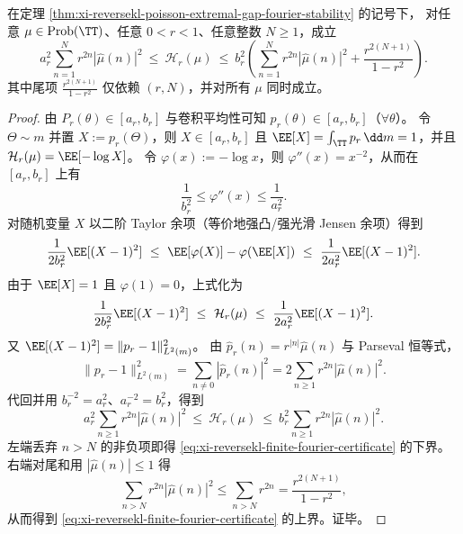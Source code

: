 \begin{theorem}\label{thm:xi-reversekl-finite-fourier-certificate}
在定理 \ref{thm:xi-reversekl-poisson-extremal-gap-fourier-stability} 的记号下，
对任意 \(\mu\in\mathrm{Prob}(\TT)\)、任意 \(0<r<1\)、任意整数 \(N\ge 1\)，成立
\begin{equation}\label{eq:xi-reversekl-finite-fourier-certificate}
\boxed{\;
a_r^{2}\sum_{n=1}^{N} r^{2n}|\widehat\mu(n)|^2
\ \le\
\mathcal H_r(\mu)
\ \le\
b_r^{2}\left(\sum_{n=1}^{N} r^{2n}|\widehat\mu(n)|^2+\frac{r^{2(N+1)}}{1-r^2}\right).\;}
\end{equation}
其中尾项 \(\frac{r^{2(N+1)}}{1-r^2}\) 仅依赖 \((r,N)\)，并对所有 \(\mu\) 同时成立。
\end{theorem}
\begin{proof}
由 \(P_r(\theta)\in[a_r,b_r]\) 与卷积平均性可知 \(p_r(\theta)\in[a_r,b_r]\)（\(\forall\theta\)）。
令 \(\Theta\sim m\) 并置 \(X:=p_r(\Theta)\)，则 \(X\in[a_r,b_r]\) 且 \(\EE[X]=\int_{\TT}p_r\,\dd m=1\)，并且
\(\mathcal H_r(\mu)=\EE[-\log X]\)。
令 \(\varphi(x):=-\log x\)，则 \(\varphi''(x)=x^{-2}\)，从而在 \([a_r,b_r]\) 上有
\[
\frac{1}{b_r^2}\le \varphi''(x)\le \frac{1}{a_r^2}.
\]
对随机变量 \(X\) 以二阶 Taylor 余项（等价地强凸/强光滑 Jensen 余项）得到
\[
\frac{1}{2b_r^{2}}\EE[(X-1)^2]\ \le\ \EE[\varphi(X)]-\varphi(\EE[X])\ \le\ \frac{1}{2a_r^{2}}\EE[(X-1)^2].
\]
由于 \(\EE[X]=1\) 且 \(\varphi(1)=0\)，上式化为
\[
\frac{1}{2b_r^{2}}\EE[(X-1)^2]\ \le\ \mathcal H_r(\mu)\ \le\ \frac{1}{2a_r^{2}}\EE[(X-1)^2].
\]
又 \(\EE[(X-1)^2]=\|p_r-1\|_{L^2(m)}^2\)。
由 \(\widehat p_r(n)=r^{|n|}\widehat\mu(n)\) 与 Parseval 恒等式，
\[
\|p_r-1\|_{L^2(m)}^2=\sum_{n\neq 0}|\widehat p_r(n)|^2
=2\sum_{n\ge 1}r^{2n}|\widehat\mu(n)|^2.
\]
代回并用 \(b_r^{-2}=a_r^2\)、\(a_r^{-2}=b_r^2\)，得到
\[
a_r^2\sum_{n\ge 1}r^{2n}|\widehat\mu(n)|^2\ \le\ \mathcal H_r(\mu)\ \le\ b_r^2\sum_{n\ge 1}r^{2n}|\widehat\mu(n)|^2.
\]
左端丢弃 \(n>N\) 的非负项即得 \eqref{eq:xi-reversekl-finite-fourier-certificate} 的下界。
右端对尾和用 \(|\widehat\mu(n)|\le 1\) 得
\[
\sum_{n>N}r^{2n}|\widehat\mu(n)|^2\le \sum_{n>N}r^{2n}=\frac{r^{2(N+1)}}{1-r^2},
\]
从而得到 \eqref{eq:xi-reversekl-finite-fourier-certificate} 的上界。证毕。
\end{proof}



